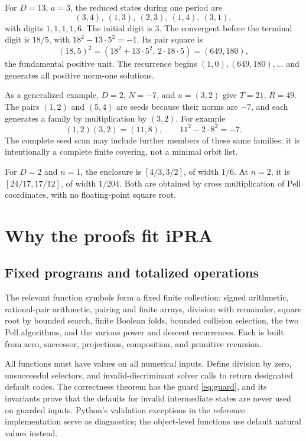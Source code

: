 \documentclass[11pt,letterpaper]{article}
\theoremstyle{definition}
\begin{document}
For $D=13$, $a=3$, the reduced states during one period are
\[
 (3,4),\ (1,3),\ (2,3),\ (1,4),\ (3,1),
\]
with digits $1,1,1,1,6$. The initial digit is $3$.
The convergent before the terminal digit is $18/5$, with
$18^2-13\cdot5^2=-1$. Its pair square is
\[
 (18,5)^2=(18^2+13\cdot5^2,\,2\cdot18\cdot5)=(649,180),
\]
the fundamental positive unit. The recurrence begins
$(1,0),(649,180),\ldots$ and generates all positive norm-one solutions.

As a generalized example, $D=2$, $N=-7$, and $u=(3,2)$ give
$T=21$, $R=49$. The pairs $(1,2)$ and $(5,4)$ are seeds because their
norms are $-7$, and each generates a family by multiplication by $(3,2)$.
For example
\[
 (1,2)(3,2)=(11,8),\qquad 11^2-2\cdot8^2=-7.
\]
The complete seed scan may include further members of these same families;
it is intentionally a complete finite covering, not a minimal orbit list.

For $D=2$ and $n=1$, the enclosure is $[4/3,3/2]$, of width $1/6$.
At $n=2$, it is $[24/17,17/12]$, of width $1/204$.
Both are obtained by cross multiplication of Pell coordinates, with no
floating-point square root.

\section{Why the proofs fit iPRA}\label{sec:audit}

\subsection{Fixed programs and totalized operations}

The relevant function symbols form a fixed finite collection: signed
arithmetic, rational-pair arithmetic, pairing and finite arrays, division
with remainder, square root by bounded search, finite Boolean folds,
bounded collision selection, the two Pell algorithms, and the various
power and descent recurrences. Each is built from zero, successor,
projections, composition, and primitive recursion.

All functions must have values on all numerical inputs. Define division by
zero, unsuccessful selectors, and invalid-discriminant solver calls to
return designated default codes. The correctness theorem has the guard
\eqref{eq:guard}, and its invariants prove that the defaults for invalid
intermediate states are never used on guarded inputs. Python's validation
exceptions in the reference implementation serve as diagnostics; the
object-level functions use default natural values instead.
\end{document}
